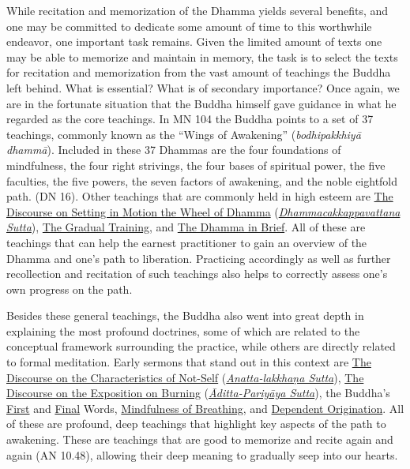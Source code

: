 While recitation and memorization of the Dhamma yields several benefits, and one may be committed to dedicate some amount of time to this worthwhile endeavor, one important task remains. Given the limited amount of texts one may be able to memorize and maintain in memory, the task is to select the texts for recitation and memorization from the vast amount of teachings the Buddha left behind. What is essential? What is of secondary importance? Once again, we are in the fortunate situation that the Buddha himself gave guidance in what he regarded as the core teachings. In MN 104 the Buddha points to a set of 37 teachings, commonly known as the ``Wings of Awakening'' (\textit{bodhipakkhiyā dhammā}). Included in these 37 Dhammas are the four foundations of mindfulness, the four right strivings, the four bases of spiritual power, the five faculties, the five powers, the seven factors of awakening, and the noble eightfold path. (DN 16). Other teachings that are commonly held in high esteem are \hyperref[wheel-of-dhamma-full]{The Discourse on Setting in Motion the Wheel of Dhamma} (\hyperref[dhammacakkappavattana-full]{\textit{Dhammacakkappavattana Sutta}}), \hyperref[gradual-training]{The Gradual Training}, and \hyperref[dhamma-in-brief]{The Dhamma in Brief}. All of these are teachings that can help the earnest practitioner to gain an overview of the Dhamma and one's path to liberation. Practicing accordingly as well as further recollection and recitation of such teachings also helps to correctly assess one's own progress on the path.

Besides these general teachings, the Buddha also went into great depth in explaining the most profound doctrines, some of which are related to the conceptual framework surrounding the practice, while others are directly related to formal meditation. Early sermons that stand out in this context are \hyperref[characteristic-of-not-self]{The Discourse on the Characteristics of Not-Self} (\hyperref[anatta-lakkhana]{\textit{Anatta-lakkhaṇa Sutta}}), \hyperref[exposition-on-burning]{The Discourse on the Exposition on Burning} (\hyperref[aditta-pariyaya]{\textit{Āditta-Pariyāya Sutta}}), the Buddha's \hyperref[buddhas-first-exclamation]{First} and \hyperref[buddhas-final-instruction]{Final} Words, \hyperref[mindfulness-of-breathing]{Mindfulness of Breathing}, and \hyperref[dependent-origination]{Dependent Origination}. All of these are profound, deep teachings that highlight key aspects of the path to awakening. These are teachings that are good to memorize and recite again and again (AN 10.48), allowing their deep meaning to gradually seep into our hearts.

